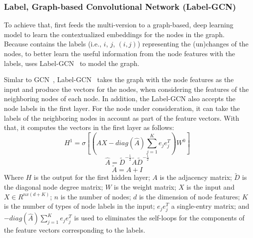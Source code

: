 \subsubsection{{\bf Label, Graph-based Convolutional Network (Label-GCN)}}

To achieve that, {\tool} first feeds the multi-version {\mvpdg} to a
graph-based, deep learning model to learn the contextualized
embeddings for the nodes in the graph. Because {\mvpdg} contains the
labels (i.e., $i$, $j$, $(i,j)$) representing the (un)changes of the
nodes, to better learn the useful information from the node features
with the labels, {\tool} uses Label-GCN~\cite{} to model the graph.




Simlar to GCN~\cite{yi}, Label-GCN~\cite{yi} takes the graph with the
node features as the input and produce the vectors for the nodes, when
considering the features of the neighboring nodes of each node.  In
addition, the Label-GCN also accepts the node labels in the first
layer. For the node under consideration, it can take the labels of the
neighboring nodes in account as part of the feature vectors. With
that, it computes the vectors in the first layer as follows:
\begin{equation}\label{eq1}
	H^1 = \sigma [(\hat{A}X-diag(\hat{A})\sum_{j=1}^{K}e_je^T_j)W^0]
\end{equation}
\begin{equation}\label{eq2}
	\hat{A} = \tilde{D}^{-\frac{1}{2}}\tilde{A}\tilde{D}^{-\frac{1}{2}}
\end{equation}
\begin{equation}\label{eq3}
	\tilde{A} = A + I
\end{equation}
Where $H$ is the output for the first hidden layer; $A$ is the
adjacency matrix; $\tilde{D}$ is the diagonal node degree matrix; $W$
is the weight matrix; $X$ is the input and $X \in R^{nx(d+K)}$; $n$ is
the number of nodes; $d$ is the dimension of node features; $K$ is the
number of types of node labels in the input; $e_je^T_j$ a single-entry
matrix; and $-diag(\hat{A})\sum_{j=1}^{K}e_je^T_j$ is used to
eliminates the self-loops for the components of the feature vectors
corresponding to the labels.

